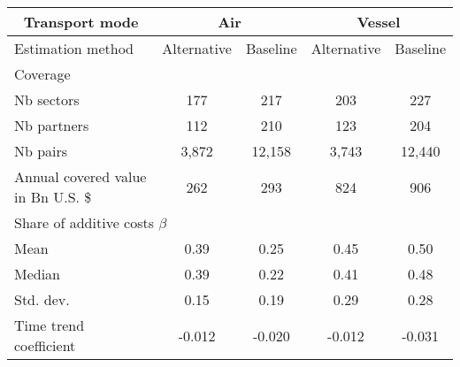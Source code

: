 \begin{tabular}{l|cc|cc}
\cline{1-5}
\multicolumn{1}{c}{Transport mode} &
  \multicolumn{2}{|c|}{Air} &
  \multicolumn{2}{c}{Vessel} \\ \hline
Estimation method &
Alternative &
Baseline &
Alternative &
Baseline \\ \hline
Coverage  \\ \hline
\hspace{1em}Nb sectors &
177 &
217 &
203 &
227 \\
\hspace{1em}Nb partners &
112 &
210 &
123 &
204 \\
\hspace{1em}Nb pairs &
3,872 &
12,158 &
3,743 &
12,440 \\ 
\hspace{1em}Annual covered value in Bn U.S. \$ &
262 &
293 &
824 &
906 \\ \hline
\multicolumn{5}{l}{Share of additive costs $\beta$}  \\ \hline
\hspace{1em}Mean &
0.39 &
0.25 &
0.45 &
0.50 \\
\hspace{1em}Median &
0.39 &
0.22 &
0.41 &
0.48 \\
\hspace{1em}Std. dev. &
0.15 &
0.19 &
0.29 &
0.28 \\
\hspace{1em}Time trend coefficient &
-0.012 &
-0.020 &
-0.012 &
-0.031 \\ \hline
\end{tabular}
